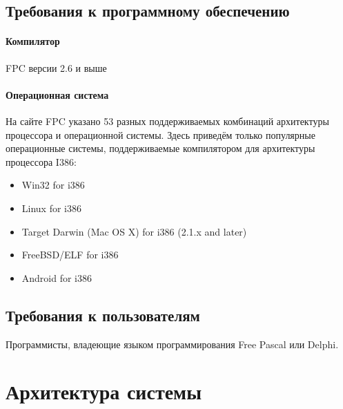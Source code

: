 \documentclass{imcs}
\begin{document}
\subsection{Требования к программному обеспечению}

\paragraph{Компилятор} FPC версии 2.6 и выше
\paragraph{Операционная система}
На сайте FPC указано 53 разных поддерживаемых комбинаций архитектуры 
процессора и операционной системы\cite{fpctargets}. Здесь приведём
только популярные операционные системы, поддерживаемые компилятором
для архитектуры процессора I386:
\begin{itemize}
    \item Win32 for i386
    \item Linux for i386
    \item Target Darwin (Mac OS X) for i386 (2.1.x and later)
    \item FreeBSD/ELF for i386
    \item Android for i386
\end{itemize}
    
\subsection{Требования к пользователям}
Программисты, владеющие языком программирования Free Pascal или Delphi.

\section{Архитектура системы}
\end{document}
